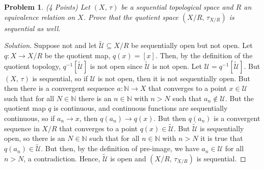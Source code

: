 \documentclass{article}
\theoremstyle{normal}
\newtheorem{problem}{Problem}
\begin{document}
    \clearpage
    \color{blue}
    \begin{problem}
        (4 Points) Let $(X,\,\tau)$ be a sequential topological space and $R$ an
        equivalence relation on $X$. Prove that the quotient space
        $(X/R,\,\tau_{X/R})$ is sequential as well.
    \end{problem}
    \color{black}
    \begin{proof}[Solution]
        Suppose not and let $\tilde{\mathcal{U}}\subseteq{X/R}$ be sequentially
        open but not open. Let $q:X\rightarrow{X}/R$ be the quotient map,
        $q(x)=[x]$. Then, by the definition of the quotient topology,
        $q^{-1}[\tilde{\mathcal{U}}]$ is not open since $\tilde{\mathcal{U}}$
        is not open. Let $\mathcal{U}=q^{-1}[\tilde{\mathcal{U}}]$. But
        $(X,\,\tau)$ is sequential, so if $\mathcal{U}$ is not open, then it
        is not sequentially open. But then there is a convergent sequence
        $a:\mathbb{N}\rightarrow{X}$ that converges to a point $x\in\mathcal{U}$
        such that for all $N\in\mathbb{N}$ there is an $n\in\mathbb{N}$ with
        $n>N$ such that $a_{n}\notin\mathcal{U}$. But the quotient map
        $q$ is continuous, and continuous functions are sequentially continuous,
        so if $a_{n}\rightarrow{x}$, then $q(a_{n})\rightarrow{q}(x)$. But then
        $q(a_{n})$ is a convergent sequence in $X/R$ that converges to a
        point $q(x)\in\tilde{\mathcal{U}}$. But $\tilde{\mathcal{U}}$ is
        sequentially open, so there is an $N\in\mathbb{N}$ such that for all
        $n\in\mathbb{N}$ with $n>N$ it is true that
        $q(a_{n})\in\tilde{\mathcal{U}}$. But then, by the definition of
        pre-image, we have $a_{n}\in\mathcal{U}$ for all $n>N$, a contradiction.
        Hence, $\tilde{\mathcal{U}}$ is open and
        $(X/R,\,\tau_{X/R})$ is sequential.
    \end{proof}
    \clearpage
    \color{blue}
\end{document}
